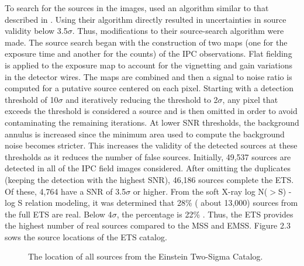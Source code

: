 To search for the sources in the images, \cite{moran1996} used an algorithm similar to that described in \cite{hamilton1991}. 
Using their algorithm directly resulted in uncertainties in source validity below 3.5$\sigma$.
Thus, modifications to their source-search algorithm were made. 
The source search began with the construction of two maps (one for the exposure time and another for the counts) of the IPC observations. 
Flat fielding is applied to the exposure map to account for the vignetting and gain variations in the detector wires.
The maps are combined and then a signal to noise ratio is computed for a putative source centered on each pixel.
Starting with a detection threshold of 10$\sigma$ and iteratively reducing the threshold to 2$\sigma$, any pixel that exceeds the threshold is considered a source and is then omitted in order to avoid contaminating the remaining iterations.
At lower SNR thresholds, the background annulus is increased since the minimum area used to compute the background noise becomes stricter. 
This increases the validity of the detected sources at these thresholds as it reduces the number of false sources.
Initially, 49,537 sources are detected in all of the IPC field images considered. 
After omitting the duplicates (keeping the detection with the highest SNR), 46,186 sources complete the ETS. 
Of these, 4,764 have a SNR of 3.5$\sigma$ or higher. From the soft X-ray log N($>$S) - log S relation modeling, it was determined that 28\% ( about 13,000) sources from the full ETS are real.
Below 4$\sigma$, the percentage is 22\% \citep{moran1996}. 
Thus, the ETS provides the highest number of real sources compared to the MSS and EMSS.
Figure 2.3 sows the source locations of the ETS catalog.


\begin{figure}[t]
\centering
{}
\caption{The location of all sources from the Einstein Two-Sigma Catalog. }
\label{imbeded_fb}
\end{figure}

